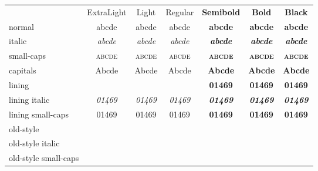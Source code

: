 \documentclass[11pt,a4paper]{article}
\newcommand*\spA{abcde}
\newcommand*\spB{01469}
\newcommand*\spr[1][\spA]{& #1 & #1 & #1 & #1 & #1 & #1 \\}
\begin{document}
\centering
\begin{tabular}{
		>{\sourcesanspro}l
		>{\sourcesansproextreme}c
		>{\sourcesansprolight}c
		>{\sourcesanspro}c
		>{\sourcesansprolight\bfseries}c
		>{\sourcesanspro\bfseries}c
		>{\sourcesansproextreme\bfseries}c }
	& ExtraLight & Light & Regular & Semibold & Bold & Black \\
	normal               \spr
	italic               \spr[\itshape\spA]
	small-caps           \spr[\scshape\spA]
	capitals             \spr[\MakeUppercase\spA]
	lining               \spr[\spB]
	lining italic        \spr[\itshape\spB]
	lining small-caps    \spr[\scshape\spB]
	old-style            \spr[\oldstylenums{\spB}]
	old-style italic     \spr[\oldstylenums{\itshape \spB}]
	old-style small-caps \spr[\oldstylenums{\scshape\spB}]
\end{tabular}
\end{document}
